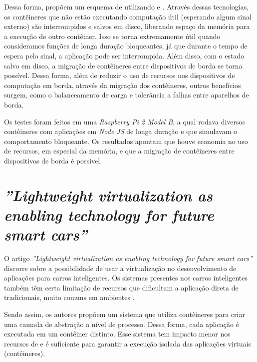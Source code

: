 Dessa forma,  propõem um esquema de \checkpointing utilizando \docker e \criu. Através dessas tecnologias, os contêineres que não estão executando computação útil (\eg esperando algum sinal externo) são interrompidos e salvos em disco, liberando espaço da memória para a execução de outro contêiner. Isso se torna extremamente útil quando consideramos funções de longa duração bloqueantes, já que durante o tempo de espera pelo sinal, a aplicação pode ser interrompida. Além disso, com o estado salvo em disco, a migração de contêineres entre dispositivos \iot de borda se torna possível. Dessa forma, além de reduzir o uso de recursos nos dispositivos de computação em borda, através da migração dos contêineres, outros benefícios surgem, como o balanceamento de carga e tolerância a falhas entre aparelhos \iot de borda.

Os testes foram feitos em uma \textit{Raspberry Pi 2 Model B}, a qual rodava diversos contêineres com aplicações em \textit{Node JS} de longa duração e que simulavam o comportamento bloqueante. Os resultados apontam que houve economia no uso de recursos, em especial da memória, e que a migração de contêineres entre dispositivos \iot de borda é possível.

\section{ \textit{''Lightweight virtualization as enabling technology for future smart cars''}}\label{sec.rw-3}

O artigo \textit{''Lightweight virtualization as enabling technology for future smart cars''} \cite{smartcarslwvirtualization} discorre sobre a possibilidade de usar a virtualização no desenvolvimento de aplicações para carros inteligentes. Os sistemas presentes nos carros inteligentes também têm certa limitação de recursos que dificultam a aplicação direta de \hypervisors tradicionais, muito comuns em ambientes \cloud.

Sendo assim, os autores propõem um sistema que utiliza contêineres \docker para criar uma camada de abstração a nível de processo. Dessa forma, cada aplicação é executada em um contêiner distinto. Esse sistema tem impacto menor nos recursos de \hardware e é suficiente para garantir a execução isolada das aplicações virtuais (contêineres).

